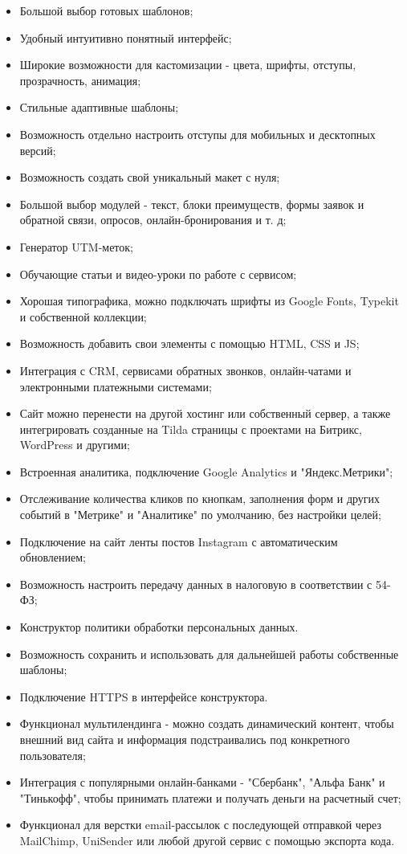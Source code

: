 \begin{itemize}
	\item	Большой выбор готовых шаблонов;
	\item	Удобный интуитивно понятный интерфейс;
	\item	Широкие возможности для кастомизации - цвета, шрифты, отступы, прозрачность, анимация;
	\item	Стильные адаптивные шаблоны;
	\item	Возможность отдельно настроить отступы для мобильных и десктопных версий;
	\item	Возможность создать свой уникальный макет с нуля;
	\item	Большой выбор модулей - текст, блоки преимуществ, формы заявок и обратной связи, опросов, онлайн-бронирования и т. д;
	\item	Генератор UTM-меток;
	\item	Обучающие статьи и видео-уроки по работе с сервисом;
	\item	Хорошая типографика, можно подключать шрифты из Google Fonts, Typekit и собственной коллекции;
	\item	Возможность добавить свои элементы с помощью HTML, CSS и JS;
	\item	Интеграция с CRM, сервисами обратных звонков, онлайн-чатами и электронными платежными системами;
	\item	Сайт можно перенести на другой хостинг или собственный сервер, а также интегрировать созданные на Tilda страницы с проектами на Битрикс, WordPress и другими;
	\item	Встроенная аналитика, подключение Google Analytics и "Яндекс.Метрики";
	\item	Отслеживание количества кликов по кнопкам, заполнения форм и других событий в "Метрике" и "Аналитике" по умолчанию, без настройки целей;
	\item	Подключение на сайт ленты постов Instagram с автоматическим обновлением;
	\item	Возможность настроить передачу данных в налоговую в соответствии с 54-ФЗ;
	\item	Конструктор политики обработки персональных данных.
	\item	Возможность сохранить и использовать для дальнейшей работы собственные шаблоны;
	\item	Подключение HTTPS в интерфейсе конструктора.
	\item	Функционал мультилендинга - можно создать динамический контент, чтобы внешний вид сайта и информация подстраивались под конкретного пользователя;
	\item	Интеграция с популярными онлайн-банками - "Сбербанк", "Альфа Банк" и "Тинькофф", чтобы принимать платежи и получать деньги на расчетный счет;
	\item	Функционал для верстки email-рассылок с последующей отправкой через MailChimp, UniSender или любой другой сервис с помощью экспорта кода.
\end{itemize}

